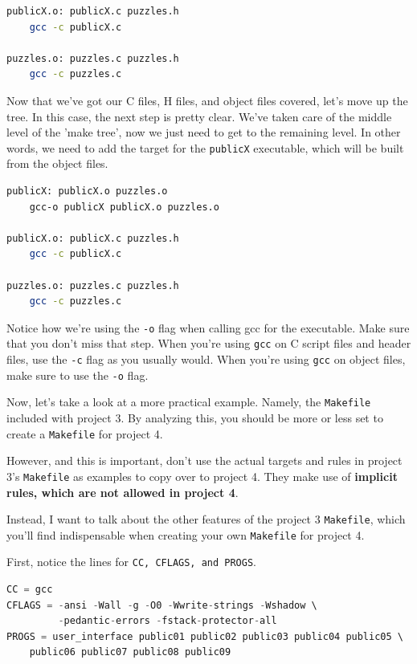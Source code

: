 \documentclass[english, 10pt]{article}
\begin{document}
\begin{lstlisting}[language=bash]
publicX.o: publicX.c puzzles.h
	gcc -c publicX.c 
	
puzzles.o: puzzles.c puzzles.h
	gcc -c puzzles.c
\end{lstlisting}

Now that we've got our C files, H files, and object files covered, let's move up the tree. In this case, the next step is pretty clear. We've taken care of the middle level of the 'make tree', now we just need to get to the remaining level. In other words, we need to add the target for the \texttt{publicX} executable, which will be built from the object files.

\begin{lstlisting}[language=bash]
publicX: publicX.o puzzles.o
	gcc-o publicX publicX.o puzzles.o

publicX.o: publicX.c puzzles.h
	gcc -c publicX.c 
	
puzzles.o: puzzles.c puzzles.h
	gcc -c puzzles.c
\end{lstlisting}

Notice how we're using the \texttt{-o} flag when calling gcc for the executable. Make sure that you don't miss that step. When you're using \texttt{gcc} on C script files and header files, use the \texttt{-c} flag as you usually would. When you're using \texttt{gcc} on object files, make sure to use the \texttt{-o} flag.\newline

Now, let's take a look at a more practical example. Namely, the \texttt{Makefile} included with project 3. By analyzing this, you should be more or less set to create a \texttt{Makefile} for project 4.\newline

However, and this is important, don't use the actual targets and rules in project 3's \texttt{Makefile} as examples to copy over to project 4. They make use of \textbf{implicit rules, which are not allowed in project 4}.\newline

Instead, I want to talk about the other features of the project 3 \texttt{Makefile}, which you'll find indispensable when creating your own \texttt{Makefile} for project 4.\newline

First, notice the lines for \texttt{CC, CFLAGS, and PROGS}.

\begin{lstlisting}[language=C]
CC = gcc
CFLAGS = -ansi -Wall -g -O0 -Wwrite-strings -Wshadow \
         -pedantic-errors -fstack-protector-all 
PROGS = user_interface public01 public02 public03 public04 public05 \
	public06 public07 public08 public09
\end{lstlisting}
\end{document}
